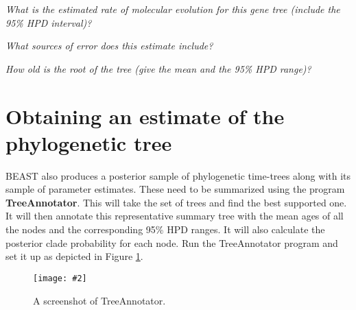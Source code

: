 \documentclass[12pt]{article}
\newcommand{\includeimage}[2][]{%
\texttt{[image: \#2]}
}
\begin{document}
\textit{What is the estimated rate of molecular evolution for this gene tree (include the 95\% HPD interval)?}


\textit{What sources of error does this estimate include?}



\textit{How old is the root of the tree (give the mean and the 95\% HPD range)?}

  
%   
%
%
%
%
\newpage

\section{Obtaining an estimate of the phylogenetic tree}

BEAST also produces a posterior sample of phylogenetic time-trees along with its sample of parameter estimates. 
These need to be summarized using the program {\bf TreeAnnotator}. This will take the set of trees and find the best
supported one. It will then annotate this representative summary tree with the mean ages of all the
nodes and the corresponding 95\% HPD ranges. It will also calculate the posterior clade probability for each
node. Run the TreeAnnotator program and set it up as depicted in Figure \ref{fig:TreeAnnotator1}.

\begin{figure}
\centering	
\includeimage[width=0.9\textwidth]{figures/TreeAnnotator1}
\caption{A screenshot of TreeAnnotator.}
\label{fig:TreeAnnotator1}
\end{figure}
\end{document}
